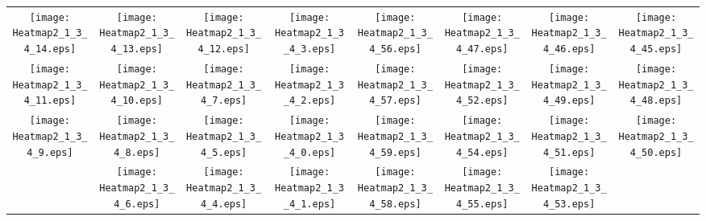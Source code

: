 \documentclass{standalone}
\begin{document}
\begin{tabular}{ *8{c} }
\texttt{[image: Heatmap2\_1\_3\_4\_14.eps]} & \texttt{[image: Heatmap2\_1\_3\_4\_13.eps]} & \texttt{[image: Heatmap2\_1\_3\_4\_12.eps]} & \texttt{[image: Heatmap2\_1\_3\_4\_3.eps]} & \texttt{[image: Heatmap2\_1\_3\_4\_56.eps]} & \texttt{[image: Heatmap2\_1\_3\_4\_47.eps]} & \texttt{[image: Heatmap2\_1\_3\_4\_46.eps]} & \texttt{[image: Heatmap2\_1\_3\_4\_45.eps]} \\
\texttt{[image: Heatmap2\_1\_3\_4\_11.eps]} & \texttt{[image: Heatmap2\_1\_3\_4\_10.eps]} & \texttt{[image: Heatmap2\_1\_3\_4\_7.eps]} & \texttt{[image: Heatmap2\_1\_3\_4\_2.eps]} & \texttt{[image: Heatmap2\_1\_3\_4\_57.eps]} & \texttt{[image: Heatmap2\_1\_3\_4\_52.eps]} & \texttt{[image: Heatmap2\_1\_3\_4\_49.eps]} & \texttt{[image: Heatmap2\_1\_3\_4\_48.eps]} \\
\texttt{[image: Heatmap2\_1\_3\_4\_9.eps]} & \texttt{[image: Heatmap2\_1\_3\_4\_8.eps]} & \texttt{[image: Heatmap2\_1\_3\_4\_5.eps]} & \texttt{[image: Heatmap2\_1\_3\_4\_0.eps]} & \texttt{[image: Heatmap2\_1\_3\_4\_59.eps]} & \texttt{[image: Heatmap2\_1\_3\_4\_54.eps]} & \texttt{[image: Heatmap2\_1\_3\_4\_51.eps]} & \texttt{[image: Heatmap2\_1\_3\_4\_50.eps]} \\
 & \texttt{[image: Heatmap2\_1\_3\_4\_6.eps]} & \texttt{[image: Heatmap2\_1\_3\_4\_4.eps]} & \texttt{[image: Heatmap2\_1\_3\_4\_1.eps]} & \texttt{[image: Heatmap2\_1\_3\_4\_58.eps]} & \texttt{[image: Heatmap2\_1\_3\_4\_55.eps]} & \texttt{[image: Heatmap2\_1\_3\_4\_53.eps]} &  
\end{tabular}
\end{document}

